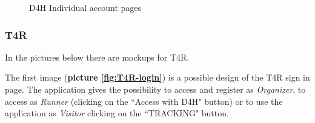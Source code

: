 \begin{figure}[H]
  \centering
  
  
  \caption{D4H Individual account pages}
  \label{fig:ASOS-individual-account}
  
\end{figure}


\subsubsection{T4R}
In the pictures below there are mockups for T4R.

The first image (\textbf{picture \ref{fig:T4R-login}}) is a possible design of the T4R sign in page. The application gives the possibility to access and register as \emph{Organizer}, to access as \emph{Runner} (clicking on the ``Access with D4H" button) or to use the application as \emph{Visitor} clicking on the ``TRACKING" button.

